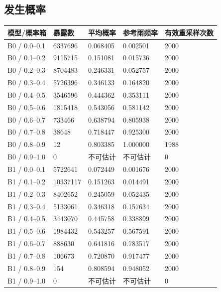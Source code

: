 \documentclass[UTF8,a4paper,10pt,fontset=fandol]{ctexart}
\begin{document}
\subsection*{发生概率}

\begin{center}\scriptsize\begin{longtable}{@{}p{\dimexpr(\linewidth-8\tabcolsep)/5\relax}p{\dimexpr(\linewidth-8\tabcolsep)/5\relax}p{\dimexpr(\linewidth-8\tabcolsep)/5\relax}p{\dimexpr(\linewidth-8\tabcolsep)/5\relax}p{\dimexpr(\linewidth-8\tabcolsep)/5\relax}@{}}\toprule
模型/概率箱 & 暴露数 & 平均概率 & 参考雨频率 & 有效重采样次数\\
\midrule\endhead
B0 / 0.0–0.1 & 6337696 & 0.068405 & 0.002501 & 2000\\
B0 / 0.1–0.2 & 9115715 & 0.151081 & 0.015736 & 2000\\
B0 / 0.2–0.3 & 8704483 & 0.246331 & 0.052757 & 2000\\
B0 / 0.3–0.4 & 5726396 & 0.346133 & 0.164820 & 2000\\
B0 / 0.4–0.5 & 3546596 & 0.444362 & 0.353111 & 2000\\
B0 / 0.5–0.6 & 1815418 & 0.543056 & 0.581142 & 2000\\
B0 / 0.6–0.7 & 733466 & 0.638794 & 0.805938 & 2000\\
B0 / 0.7–0.8 & 38648 & 0.718447 & 0.925300 & 2000\\
B0 / 0.8–0.9 & 12 & 0.803385 & 1.000000 & 1988\\
B0 / 0.9–1.0 & 0 & 不可估计 & 不可估计 & 0\\
B1 / 0.0–0.1 & 5722641 & 0.072449 & 0.001676 & 2000\\
B1 / 0.1–0.2 & 10337117 & 0.151263 & 0.014491 & 2000\\
B1 / 0.2–0.3 & 8402652 & 0.245059 & 0.052435 & 2000\\
B1 / 0.3–0.4 & 5133061 & 0.346318 & 0.157634 & 2000\\
B1 / 0.4–0.5 & 3443070 & 0.445758 & 0.338899 & 2000\\
B1 / 0.5–0.6 & 1984432 & 0.543257 & 0.567591 & 2000\\
B1 / 0.6–0.7 & 888630 & 0.641816 & 0.783517 & 2000\\
B1 / 0.7–0.8 & 106673 & 0.720870 & 0.917477 & 2000\\
B1 / 0.8–0.9 & 154 & 0.808594 & 0.948052 & 2000\\
B1 / 0.9–1.0 & 0 & 不可估计 & 不可估计 & 0\\
\bottomrule\end{longtable}\end{center}\normalsize
\end{document}

